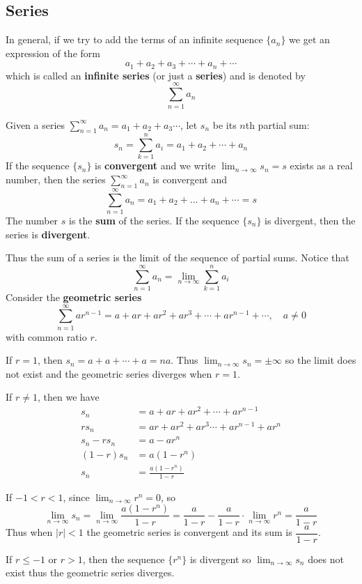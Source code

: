 \subsection{Series}

In general, if we try to add the terms of an infinite sequence \(\{a_n\}\) we
get an expression of the form
\[a_1+a_2+a_3+\cdots+a_n+\cdots\]
which is called an \textbf{infinite series} (or just a \textbf{series}) and is
denoted by
\[\sum_{n=1}^\infty a_n\]
\begin{definition}
    Given a series
    \(\displaystyle{\sum_{n=1}^{\infty}a_n=a_1+a_2+a_3\cdots}\), let \(s_n\)
    be its \(n\)th partial sum:
    \[s_n=\sum_{k=1}^n a_i=a_1+a_2+\cdots+a_n\]
    If the sequence \(\{s_n\}\) is \textbf{convergent} and we write
    \(\displaystyle{\lim_{n\to\infty}s_n=s}\) exists as a real number, then the
    series \(\displaystyle{\sum_{n=1}^\infty a_n}\) is convergent and
    \[\sum_{n=1}^{\infty}a_n=a_1+a_2+\dots+a_n+\cdots=s\]
    The number \(s\) is the \textbf{sum} of the series.
    If the sequence \(\{s_n\}\) is divergent, then the series is
    \textbf{divergent}.
\end{definition}
Thus the sum of a series is the limit of the sequence of partial sums.
Notice that
\[\sum_{n=1}^\infty a_n=\lim_{n\to\infty}\sum_{k=1}^n a_i\]
Consider the \textbf{geometric series}
\[\sum_{n=1}^\infty ar^{n-1}=a+ar+ar^2+ar^3+\cdots+ar^{n-1}+\cdots,
\quad a\neq 0\]
with common ratio \(r\).

If \(r=1\), then \(s_n=a+a+\cdots+a=na\).
Thus \(\displaystyle{\lim_{n\to\infty}s_n=\pm\infty}\) so the limit does not
exist and the geometric series diverges when \(r=1\).

If \(r\neq 1\), then we have
\begin{align*}
    s_n &= a+ar+ar^2+\cdots+ar^{n-1} \\
    rs_n &= ar+ar^2+ar^3\cdots+ar^{n-1}+ar^n \\
    s_n-rs_n &= a-ar^n \\
    (1-r)s_n &= a(1-r^n) \\
    s_n &= \frac{a(1-r^n)}{1-r}
\end{align*}

If \(-1<r<1\), since \(\displaystyle{\lim_{n\to\infty}r^n}=0\), so
\[\lim_{n\to\infty}s_n=\lim_{n\to\infty}\frac{a(1-r^n)}{1-r}
=\frac{a}{1-r}-\frac{a}{1-r}\cdot\lim_{n\to\infty}r^n=\frac{a}{1-r}\]
Thus when \(|r|<1\) the geometric series is convergent and its sum is
\(\dfrac{a}{1-r}\).

If \(r\leq -1\) or \(r>1\), then the sequence \(\{r^n\}\) is divergent so
\(\displaystyle{\lim_{n\to\infty}s_n}\) does not exist thus the geometric
series diverges.

